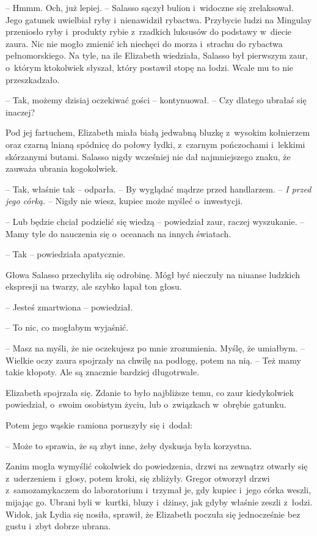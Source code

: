 \documentclass[oneside,polish,12pt,sfheadings]{mwbk}
\begin{document}
-- Hmmm. Och, już lepiej. -- Salasso sączył bulion i~widoczne się
zrelaksował. Jego gatunek uwielbiał ryby i~nienawidził rybactwa.
Przybycie ludzi na Mingulay przeniosło ryby i~produkty rybie z~rzadkich
luksusów do podstawy w~diecie zaura. Nic nie mogło zmienić ich niechęci
do morza i~strachu do rybactwa pełnomorskiego. Na tyle, na ile Elizabeth
wiedziała, Salasso był pierwszym zaur, o~którym ktokolwiek słyszał,
który postawił stopę na łodzi. Wcale mu to nie przeszkadzało.

-- Tak, możemy dzisiaj oczekiwać gości -- kontynuował. -- Czy dlatego
ubrałaś się inaczej?

Pod jej fartuchem, Elizabeth miała białą jedwabną bluzkę z~wysokim
kołnierzem oraz czarną lnianą spódnicę do połowy łydki, z~czarnym
pończochami i~lekkimi skórzanymi butami. Salasso nigdy wcześniej nie dał
najmniejszego znaku, że zauważa ubrania kogokolwiek.

-- Tak, właśnie tak -- odparła. -- By wyglądać mądrze przed handlarzem. --
\emph{I przed jego córką. } -- Nigdy nie wiesz, kupiec może myśleć o~inwestycji.

-- Lub będzie chciał podzielić się wiedzą -- powiedział zaur, raczej
wyszukanie. -- Mamy tyle do nauczenia się o~oceanach na innych światach.

-- Tak -- powiedziała apatycznie.

Głowa Salasso przechyliła się odrobinę. Mógł być nieczuły na niuanse
ludzkich ekspresji na twarzy, ale szybko łapał ton głosu.

-- Jesteś zmartwiona -- powiedział.

-- To nic, co mogłabym wyjaśnić.

-- Masz na myśli, że nie oczekujesz po mnie zrozumienia. Myślę, że
umiałbym. -- Wielkie oczy zaura spojrzały na chwilę na podłogę, potem na
nią. -- Też mamy takie kłopoty. Ale są znacznie bardziej długotrwałe.

Elizabeth spojrzała się. Zdanie to było najbliższe temu, co zaur
kiedykolwiek powiedział, o~swoim osobistym życiu, lub o~związkach w~obrębie gatunku.

Potem jego wąskie ramiona poruszyły się i~dodał: 

-- Może to sprawia, że
są zbyt inne, żeby dyskusja była korzystna.

Zanim mogła wymyślić cokolwiek do powiedzenia, drzwi na zewnątrz otwarły
się z~uderzeniem i~głosy, potem kroki, się zbliżyły. Gregor otworzył
drzwi z~samozamykaczem do laboratorium i~trzymał je, gdy kupiec i~jego
córka weszli, mijając go. Ubrani byli w~kurtki, bluzy i~dżinsy, jak
gdyby właśnie zeszli z~łodzi. Widok, jak Lydia się nosiła, sprawił, że
Elizabeth poczuła się jednocześnie bez gustu i~zbyt dobrze ubrana.
\end{document}

